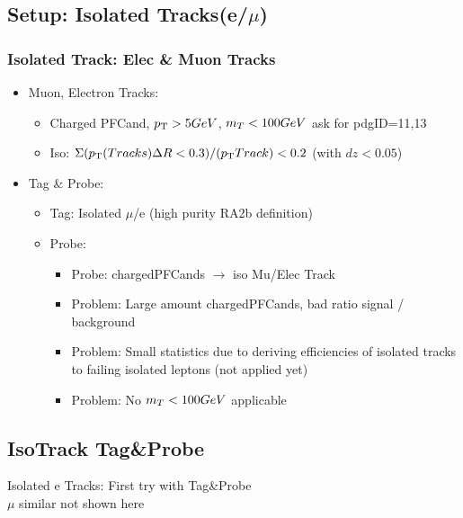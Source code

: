 \documentclass{beamer}
\begin{document}
\subsection{Setup: Isolated Tracks(e/$\mu$)}
\begin{frame}
 \frametitle{Isolated Track: Elec \& Muon Tracks}
 \begin{itemize}
 \item Muon, Electron Tracks:
 \begin{itemize}
  \item Charged PFCand, $p_{\text{T}}>5 GeV$, $m_{T}<100 GeV$ ask for pdgID=11,13
  \item Iso: $\Sigma ( p_{\text{T}}\text(Tracks)\Delta R<0.3 )/(p_{\text{T}} Track) < 0.2$ (with $dz<0.05$)
 \end{itemize}
 \item Tag \& Probe:
 \begin{itemize}
  \item Tag: Isolated $\mu$/e (high purity RA2b definition)
  \item Probe:
 \begin{itemize}
  \item Probe: chargedPFCands $\rightarrow$ iso Mu/Elec Track
  \item Problem: Large amount chargedPFCands, bad ratio signal / background
  \item Problem: Small statistics due to deriving efficiencies of isolated tracks to failing isolated leptons (not applied yet)
  \item Problem: No $m_{T}<100 GeV$ applicable
 \end{itemize}
  \end{itemize}
 \end{itemize}
\end{frame}
\subsection{IsoTrack Tag\&Probe}
\begin{frame}
 \begin{block}{}
 \centering
 \Large Isolated e Tracks: First try with Tag\&Probe \\
 \small $\mu$ similar not shown here
 \end{block}
\end{frame}
\end{document}
